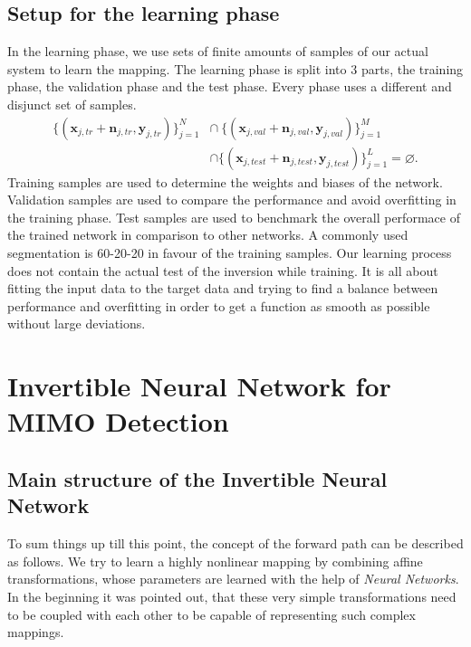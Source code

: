 \documentclass[oneside]{msvreport}%
\newcommand{\B}[1]{\boldsymbol{#1}}
\newcommand{\e}[1]{\emph{#1}}
\begin{document}
\section{Setup for the learning phase}
In the learning phase, we use sets of finite amounts of samples of our actual system to learn the mapping. The learning phase is split into 3 parts, the training phase, the validation phase and the test phase. Every phase uses a different and disjunct set of samples.
\begin{equation}
\begin{split}
	\{ (\B{x}_{j, tr} + \B{n}_{j, tr}, \B{y}_{j, tr})\}^{N}_{j = 1} & \cap \  \{ (\B{x}_{j, val} + \B{n}_{j, val}, \B{y}_{j, val})\}^{M}_{j = 1} \\ &\cap  \{ (\B{x}_{j, test} + \B{n}_{j, test}, \B{y}_{j, test})\}^{L}_{j = 1} = \varnothing.
\end{split}
\end{equation}
Training samples are used to determine the weights and biases of the network. Validation samples are used to compare the performance and avoid overfitting in the training phase. Test samples are used to benchmark the overall performace of the trained network in comparison to other networks. A commonly used segmentation is 60-20-20 in favour of the training samples. Our learning process does not contain the actual test of the inversion while training. It is all about fitting the input data to the target data and trying to find a balance between performance and overfitting in order to get a function as smooth as possible without large deviations.


\chapter{Invertible Neural Network for MIMO Detection}
\section{Main structure of the Invertible Neural Network}
\label{main_structure}
To sum things up till this point, the concept of the forward path can be described as follows. We try to learn a highly nonlinear mapping by combining affine transformations, whose parameters are learned with the help of \e{Neural Networks}. In the beginning it was pointed out, that these very simple transformations need to be coupled with each other to be capable of representing such complex mappings.\\ 
\end{document}
